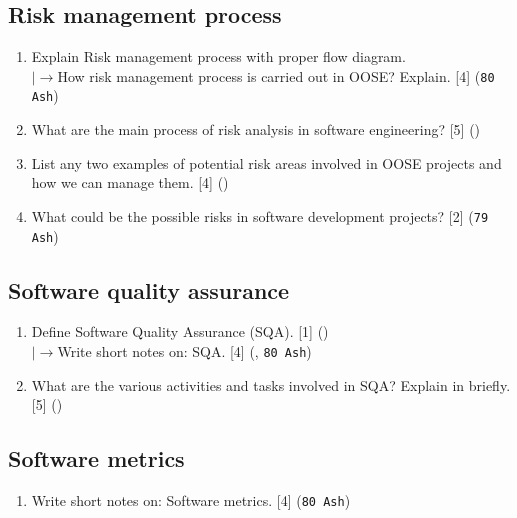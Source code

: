 \documentclass[12pt]{article}
\newcommand{\lb}{\\$\left|\rightarrow\right.$}
\begin{document}
  \subsection{Risk management process}
    \begin{enumerate}
      \item Explain Risk management process with proper flow diagram.
        \lb How risk management process is carried out in OOSE? Explain. \hfill [4] (\texttt{80 Ash})

      \item What are the main process of risk analysis in software engineering? \hfill [5] ()

      \item List any two examples of potential risk areas involved in OOSE projects and how we can manage them. \hfill [4] ()

      \item What could be the possible risks in software development projects? \hfill [2] (\texttt{79 Ash})
    \end{enumerate}

  \subsection{Software quality assurance}
    \begin{enumerate}
      \item Define Software Quality Assurance (SQA). \hfill [1] ()
        \lb Write short notes on: SQA. \hfill [4] (, \texttt{80 Ash})

      \item What are the various activities and tasks involved in SQA? Explain in briefly. \hfill [5] ()
    \end{enumerate}
    
  \subsection{Software metrics}
    \begin{enumerate}
      \item Write short notes on: Software metrics. \hfill [4] (\texttt{80 Ash})
    \end{enumerate}

\pagebreak
\end{document}
